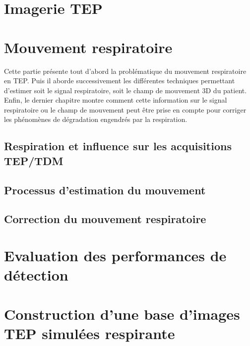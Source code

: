 \documentclass[12pt, a4paper]{book}
\begin{document}
 \listoffigures

 \listoftables

\newpage



\part{Imagerie TEP}
		
			
\part{Mouvement respiratoire}

Cette partie présente tout d'abord la problématique du mouvement respiratoire en TEP. Puis il aborde successivement les différentes techniques permettant d'estimer soit le signal respiratoire, soit le champ de mouvement 3D du patient. Enfin, le dernier chapitre montre comment cette information sur le signal respiratoire ou le champ de mouvement peut être prise en compte pour corriger les phénomènes de dégradation engendrés par la respiration.

	\chapter{Respiration et influence sur les acquisitions TEP/TDM}
	
	
	\chapter{Processus d'estimation du mouvement}
	
	
	\chapter{Correction du mouvement respiratoire}
	

\part{Evaluation des performances de détection}
	
	

\part{Construction d'une base d'images TEP simulées respirante}
	
	
\end{document}
